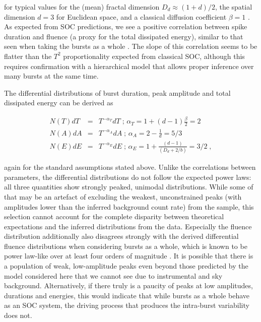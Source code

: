 \documentclass[12pt]{emulateapj}
\begin{document}
for typical values for the (mean) fractal dimension $D_d \approx (1+d)/2$, the spatial dimension $d = 3$ for Euclidean space, and a
classical diffusion coefficient  $\beta = 1$ \citep[see ][ and references therein for details of the derivation]{aschwanden2014}. 
As expected from SOC predictions, we see a positive correlation between spike duration and 
fluence (a proxy for the total dissipated energy), similar to that seen when taking the bursts as a whole \citep{gogus1999}. 
The slope of this correlation seems to be flatter than the $T^{2}$ proportionality
expected from classical SOC, although this requires confirmation with a hierarchical model that allows proper inference over many
bursts at the same time.  

The differential distributions of burst duration, peak amplitude and total dissipated energy can be derived as

\begin{eqnarray}
N(T) dT &=& T^{-\alpha_T}dT \;  \mbox{; $\alpha_T = 1 + (d-1)\frac{\beta}{2}$} = 2\nonumber \\ 
N(A) dA &=& T^{-\alpha_A}dA \; \mbox{; $\alpha_A = 2 - \frac{1}{d}$} = 5/3 \\
N(E) dE & = &T^{-\alpha_E}dE  \;\mbox{; $\alpha_E = 1 + \frac{(d-1)}{(D_d + 2/b)}$} =  3/2 \; ,  \nonumber
\end{eqnarray}

again for the standard assumptions stated above. Unlike the correlations between parameters, the differential
 distributions do not follow the expected power laws: all three quantities show strongly peaked, unimodal distributions.
 While some of that may be an artefact of excluding the weakest, unconstrained peaks (with amplitudes lower than the inferred
 background count rate) from the sample, this selection cannot account for the complete disparity between theoretical 
 expectations and the inferred distributions from the data. Especially the fluence distribution additionally also disagrees strongly
 with the derived differential fluence distributions when considering bursts as a whole, which is known to be power law-like over at least 
 four orders of magnitude \citep{gogus1999,gogus2000,prieskorn2012}.
 It is possible that there is a population of weak, low-amplitude peaks even beyond those predicted by the model considered 
 here that we cannot see due to instrumental and sky background.
Alternatively, if there truly is a paucity of peaks at low amplitudes, durations and energies, this would indicate that while bursts as a
whole behave as an SOC system, the driving process that produces the intra-burst variability does not.
\end{document}
